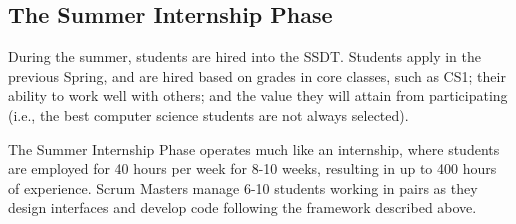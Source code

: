 

\subsection{The Summer Internship Phase}
During the summer, students are hired into the SSDT. Students apply in the previous Spring, and are hired based on grades in core classes, such as CS1; their ability to work well with others; and the value they will attain from participating (i.e., the best computer science students are not always selected). 

The Summer Internship Phase operates much like an internship, where students are employed for 40 hours per week for 8-10 weeks, resulting in up to 400 hours of experience. Scrum Masters manage 6-10 students working in pairs as they design interfaces and develop code following the framework described above. 






